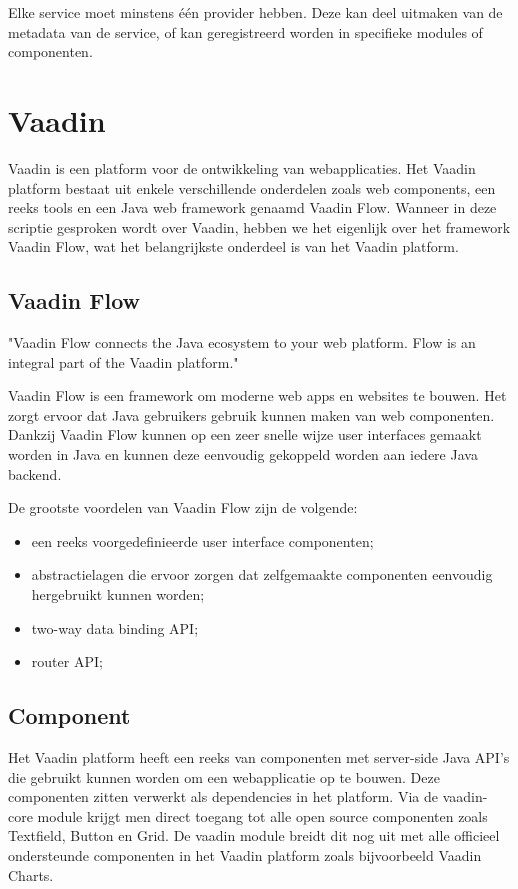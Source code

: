 Elke service moet minstens één provider hebben. Deze kan deel uitmaken van de metadata van de service, of kan geregistreerd worden in specifieke modules of componenten. 

\section{Vaadin}
Vaadin is een platform voor de ontwikkeling van webapplicaties. Het Vaadin platform bestaat uit enkele verschillende onderdelen zoals web components, een reeks tools en een Java web framework genaamd Vaadin Flow. Wanneer in deze scriptie gesproken wordt over Vaadin, hebben we het eigenlijk over het framework Vaadin Flow, wat het belangrijkste onderdeel is van het Vaadin platform. 
\subsection{Vaadin Flow}

"Vaadin Flow connects the Java ecosystem to your web platform. Flow is an integral part of the Vaadin platform." \autocite{Vaadin2019} 

Vaadin Flow is een framework om moderne web apps en websites te bouwen. Het zorgt ervoor dat Java gebruikers gebruik kunnen maken van web componenten. Dankzij Vaadin Flow kunnen op een zeer snelle wijze user interfaces gemaakt worden in Java en kunnen deze eenvoudig gekoppeld worden aan iedere Java backend.

De grootste voordelen van Vaadin Flow zijn de volgende:
\begin{itemize}
	\item een reeks voorgedefinieerde user interface componenten;
	\item abstractielagen die ervoor zorgen dat zelfgemaakte componenten eenvoudig hergebruikt kunnen worden;
	\item two-way data binding API;
	\item router API;
\end{itemize}

\subsection{Component}
Het Vaadin platform heeft een reeks van componenten met server-side Java API's die gebruikt kunnen worden om een webapplicatie op te bouwen. Deze componenten zitten verwerkt als dependencies in het platform. Via de vaadin-core module krijgt men direct toegang tot alle open source componenten zoals Textfield, Button en Grid. De vaadin module breidt dit nog uit met alle officieel ondersteunde componenten in het Vaadin platform zoals bijvoorbeeld Vaadin Charts. 


